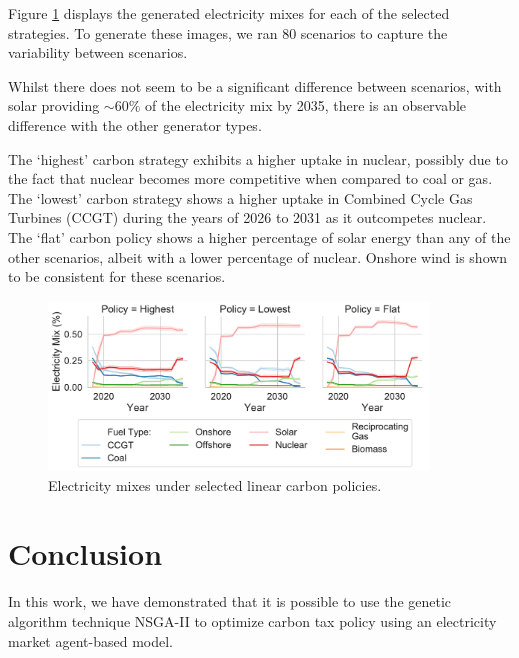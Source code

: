 Figure \ref{fig:best_electricity_mixes_facet} displays the generated electricity mixes for each of the selected strategies. To generate these images, we ran 80 scenarios to capture the variability between scenarios. 

Whilst there does not seem to be a significant difference between scenarios, with solar providing ${\sim}60\%$ of the electricity mix by 2035, there is an observable difference with the other generator types.

The `highest' carbon strategy exhibits a higher uptake in nuclear, possibly due to the fact that nuclear becomes more competitive when compared to coal or gas. The `lowest' carbon strategy shows a higher uptake in Combined Cycle Gas Turbines (CCGT) during the years of 2026 to 2031 as it outcompetes nuclear. The `flat' carbon policy shows a higher percentage of solar energy than any of the other scenarios, albeit with a lower percentage of nuclear. Onshore wind is shown to be consistent for these scenarios.

\begin{figure}
	\centering
	\includegraphics[width=0.9\textwidth]{Chapter6/figures/results/best_electricity_mixes_facet}
	\caption{Electricity mixes under selected linear carbon policies.}
	\label{fig:best_electricity_mixes_facet}
\end{figure}






\section{Conclusion}
\label{carbonoptim:sec:conclusion}



In this work, we have demonstrated that it is possible to use the genetic algorithm technique NSGA-II to optimize carbon tax policy using an electricity market agent-based model. 

